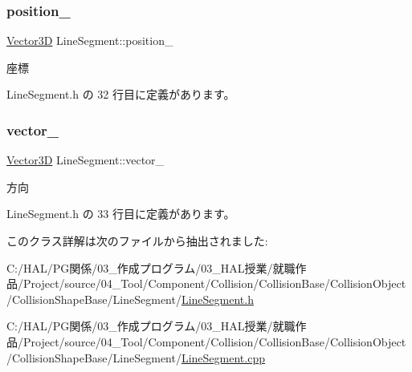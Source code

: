 \subsubsection{\texorpdfstring{position\+\_\+}{position\_}}
{\footnotesize\ttfamily \mbox{\hyperlink{class_vector3_d}{Vector3D}} Line\+Segment\+::position\+\_\+\hspace{0.3cm}{\ttfamily [private]}}



座標 



 Line\+Segment.\+h の 32 行目に定義があります。

\mbox{\label{class_line_segment_a8a0af480c7798ce5d9975dce984cae38}} 
\subsubsection{\texorpdfstring{vector\+\_\+}{vector\_}}
{\footnotesize\ttfamily \mbox{\hyperlink{class_vector3_d}{Vector3D}} Line\+Segment\+::vector\+\_\+\hspace{0.3cm}{\ttfamily [private]}}



方向 



 Line\+Segment.\+h の 33 行目に定義があります。



このクラス詳解は次のファイルから抽出されました\+:\begin{DoxyCompactItemize}
\item 
C\+:/\+H\+A\+L/\+P\+G関係/03\+\_\+作成プログラム/03\+\_\+\+H\+A\+L授業/就職作品/\+Project/source/04\+\_\+\+Tool/\+Component/\+Collision/\+Collision\+Base/\+Collision\+Object/\+Collision\+Shape\+Base/\+Line\+Segment/\mbox{\hyperlink{_line_segment_8h}{Line\+Segment.\+h}}\item 
C\+:/\+H\+A\+L/\+P\+G関係/03\+\_\+作成プログラム/03\+\_\+\+H\+A\+L授業/就職作品/\+Project/source/04\+\_\+\+Tool/\+Component/\+Collision/\+Collision\+Base/\+Collision\+Object/\+Collision\+Shape\+Base/\+Line\+Segment/\mbox{\hyperlink{_line_segment_8cpp}{Line\+Segment.\+cpp}}\end{DoxyCompactItemize}

